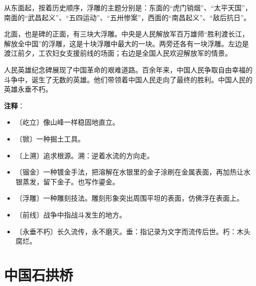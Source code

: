 \documentclass[12pt,UTF-8,openany]{ctexbook}
\begin{document}
\begin{normalsize}
    从东面起，按着历史顺序，浮雕的主题分别是：东面的“虎门销烟”、“太平天国”，南面的“武昌起义”、“五四运动”、“五卅惨案”，西面的“南昌起义”、“敌后抗日”。
    
    北面，也是碑的正面，有三块大浮雕。中央是人民解放军百万雄师“胜利渡长江，解放全中国”的浮雕，这是十块浮雕中最大的一块。两旁还各有一块浮雕。左边是渡江前夕，工农妇女支援前线的场面；右边是全国人民欢迎解放军的情景。
    
    人民英雄纪念碑展现了中国革命的艰难道路。百余年来，中国人民争取自由幸福的斗争中，诞生了无数的英雄。他们带领着中国人民走向了最终的胜利。中国人民的英雄永垂不朽。
    
\end{normalsize}


\newpage

\textbf{注释}：

\vspace{-1em}

\begin{itemize}
    \setlength\itemsep{-0.2em}
    \item 〔屹立〕像山峰一样稳固地直立。
    \item 〔锨〕一种掘土工具。
    \item 〔上溯〕追求根源。溯：逆着水流的方向走。
    \item 〔镏金〕一种镀金手法，把溶解在水银里的金子涂刷在金属表面，再加热让水银蒸发，留下金子。也写作鎏金。
    \item 〔浮雕〕一种雕刻技法。雕刻形象突出周围平坦的表面，仿佛浮在表面上。
    \item 〔前线〕战争中指战斗发生的地方。
    \item 〔永垂不朽〕长久流传，永不磨灭。垂：指记录为文字而流传后世。朽：木头腐烂。
\end{itemize}

\chapter{中国石拱桥}
\end{document}

